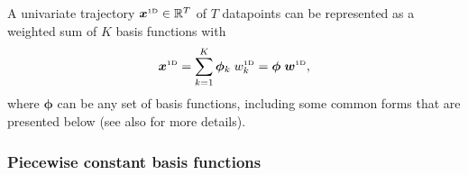 \documentclass[10pt,a4paper]{article} %
\newcommand{\tp}[1]{\text{\tiny#1}}
\begin{document}
A univariate trajectory $\bm{x}^\tp{1D}\in\mathbb{R}^T$ of $T$ datapoints can be represented as a weighted sum of $K$ basis functions with
\begin{equation}
	\bm{x}^\tp{1D} = \sum_{k=1}^{K} \bm{\phi}_{k} \; w^\tp{1D}_k = \bm{\phi} \; \bm{w}^\tp{1D},
\end{equation}
where $\bm{\phi}$ can be any set of basis functions, including some common forms that are presented below (see also \cite{Calinon19MM} for more details).


\subsubsection*{Piecewise constant basis functions}
\end{document}
